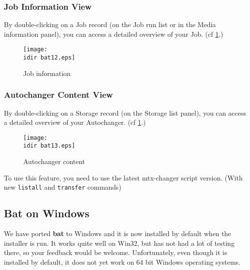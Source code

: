 \subsubsection{Job Information View}

By double-clicking on a Job record (on the Job run list or in the Media
information panel), you can access a detailed overview of your Job. (cf
\ref{fig:jobinfo}.)
\begin{figure}[htbp]
  \centering
  \texttt{[image: \\idir bat12.eps]}  
  \caption{Job information}
  \label{fig:jobinfo}
\end{figure}

\subsubsection{Autochanger Content View}

By double-clicking on a Storage record (on the Storage list panel), you can
access a detailed overview of your Autochanger. (cf \ref{fig:jobinfo}.)
\begin{figure}[htbp]
  \centering
  \texttt{[image: \\idir bat13.eps]}  
  \caption{Autochanger content}
  \label{fig:achcontent}
\end{figure}

To use this feature, you need to use the latest mtx-changer script
version. (With new \texttt{listall} and \texttt{transfer} commands)

\subsection{Bat on Windows}
We have ported {\bf bat} to Windows and it is now installed 
by default when the installer is run.  It works quite well 
on Win32, but has not had a lot of testing there, so your
feedback would be welcome.  Unfortunately, even though it is
installed by default, it does not yet work on 64 bit Windows
operating systems.

